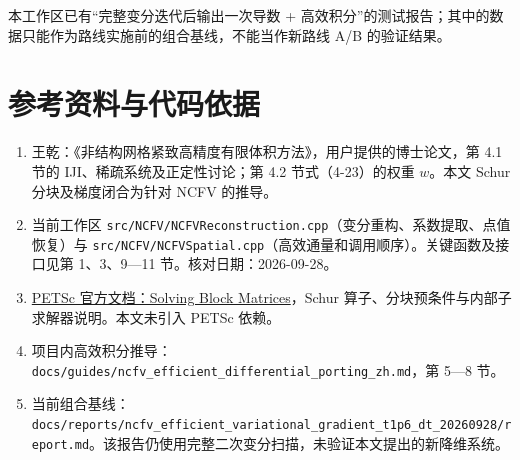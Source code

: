 \documentclass[
  11pt,
  a4paper,
]{article}
\providecommand{\tightlist}{%
  \setlength{\itemsep}{0pt}\setlength{\parskip}{0pt}}
\begin{document}
本工作区已有``完整变分迭代后输出一次导数 +
高效积分''的测试报告；其中的数据只能作为路线实施前的组合基线，不能当作新路线
A/B 的验证结果。

\hypertarget{ux53c2ux8003ux8d44ux6599ux4e0eux4ee3ux7801ux4f9dux636e}{%
\section{参考资料与代码依据}\label{ux53c2ux8003ux8d44ux6599ux4e0eux4ee3ux7801ux4f9dux636e}}

\begin{enumerate}
\def\labelenumi{\arabic{enumi}.}
\tightlist
\item
  王乾：《非结构网格紧致高精度有限体积方法》，用户提供的博士论文，第 4.1
  节的 IJI、稀疏系统及正定性讨论；第 4.2 节式（4-23）的权重 \(w\)。本文
  Schur 分块及梯度闭合为针对 NCFV 的推导。
\item
  当前工作区
  \texttt{src/NCFV/NCFVReconstruction.cpp}（变分重构、系数提取、点值恢复）与
  \texttt{src/NCFV/NCFVSpatial.cpp}（高效通量和调用顺序）。关键函数及接口见第
  1、3、9---11 节。核对日期：2026-09-28。
\item
  \href{https://petsc.org/release/manual/ksp/\#solving-block-matrices}{PETSc
  官方文档：Solving Block Matrices}，Schur
  算子、分块预条件与内部子求解器说明。本文未引入 PETSc 依赖。
\item
  项目内高效积分推导：\texttt{docs/guides/ncfv\_efficient\_differential\_porting\_zh.md}，第
  5---8 节。
\item
  当前组合基线：\texttt{docs/reports/ncfv\_efficient\_variational\_gradient\_t1p6\_dt\_20260928/report.md}。该报告仍使用完整二次变分扫描，未验证本文提出的新降维系统。
\end{enumerate}
\end{document}
